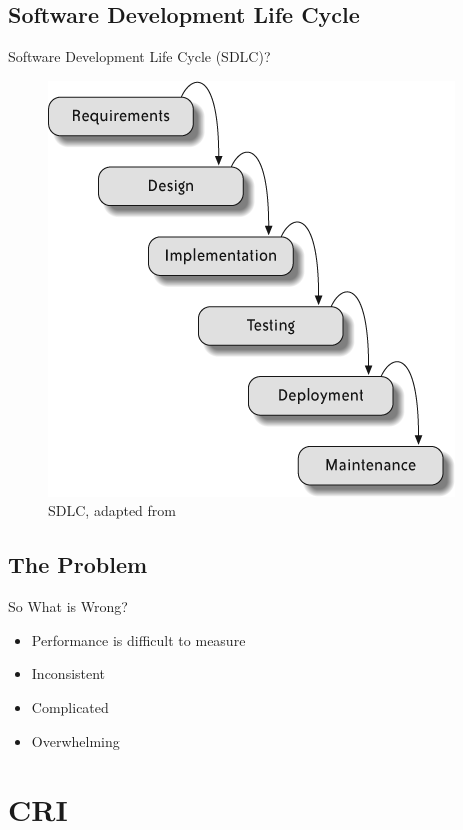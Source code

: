     \subsection[SDLC]{Software Development Life Cycle}
        \begin{frame}{Software Development Life Cycle (SDLC)?}
            \begin{figure}[ht]
                \centering
                \includegraphics[scale=.86]{images/waterfall.png}
                \caption{SDLC, adapted from \cite{Hibbs2009} }
            \end{figure}
        \end{frame}
    
    \subsection{The Problem}
        \begin{frame}{So What is Wrong?}
            \begin{itemize}
                \item Performance is difficult to measure
                \item Inconsistent
                \item Complicated
                \item Overwhelming
            \end{itemize}
        \end{frame}
    
\section{CRI}

